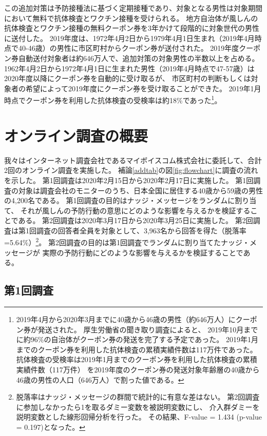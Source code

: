 \documentclass[
  11pt,
  a4paper,
]{article}
\begin{document}
この追加対策は予防接種法に基づく定期接種であり、対象となる男性は対象期間において無料で抗体検査とワクチン接種を受けられる。
地方自治体が風しんの抗体検査とワクチン接種の無料クーポン券を3年かけて段階的に対象世代の男性に送付した。
2019年度は、1972年4月2日から1979年4月1日生まれ（2019年4月時点で40-46歳）の男性に市区町村からクーポン券が送付された。
2019年度クーポン券自動送付対象者は約646万人で、追加対策の対象男性の半数以上を占める。
1962年4月2日から1972年4月1日に生まれた男性（2019年4月時点で47-57歳）は2020年度以降にクーポン券を自動的に受け取るが、
市区町村の判断もしくは対象者の希望によって2019年度にクーポン券を受け取ることができた。
2019年1月時点でクーポン券を利用した抗体検査の受検率は約18\%であった\footnote{2019年4月から2020年3月までに40歳から46歳の男性（約646万人）にクーポン券が発送された。
  厚生労働省の聞き取り調査によると、
  2019年10月までに約96\%の自治体がクーポン券の発送を完了する予定であった。
  2019年1月までのクーポン券を利用した抗体検査の累積実績件数は117万件であった。
  抗体検査の受検率は2019年1月までのクーポン券を利用した抗体検査の累積実績件数（117万件）
  を2019年度のクーポン券の発送対象年齢層の40歳から46歳の男性の人口（646万人）で割った値である。
}。

\hypertarget{experiment}{%
\section{オンライン調査の概要}\label{experiment}}

我々はインターネット調査会社であるマイボイスコム株式会社に委託して、合計2回のオンライン調査を実施した。
補論\ref{addtab}の図\ref{fig:flowchart}に調査の流れを示した。
第1回調査は2020年2月15日から2020年2月17日に実施した。
第1回調査の対象は調査会社のモニターのうち、日本全国に居住する40歳から59歳の男性の4,200名である。
第1回調査の目的はナッジ・メッセージをランダムに割り当て、
それが風しんの予防行動の意思にどのような影響を与えるかを検証することである。
第2回調査は2020年3月17日から2020年3月25日に実施した。
第2回調査は第1回調査の回答者全員を対象として、3,963名から回答を得た（脱落率=5.64\%）\footnote{脱落率はナッジ・メッセージの群間で統計的に有意な差はない。
  第2回調査に参加しなかったら1を取るダミー変数を被説明変数にし、
  介入群ダミーを説明変数とした線形回帰分析を行った。
  その結果、F-value = 1.434 (p-value = 0.197)となった。}。
第2回調査の目的は第1回調査でランダムに割り当てたナッジ・メッセージが
実際の予防行動にどのような影響を与えるかを検証することである。

\hypertarget{wave1}{%
\subsection{第1回調査}\label{wave1}}
\end{document}
